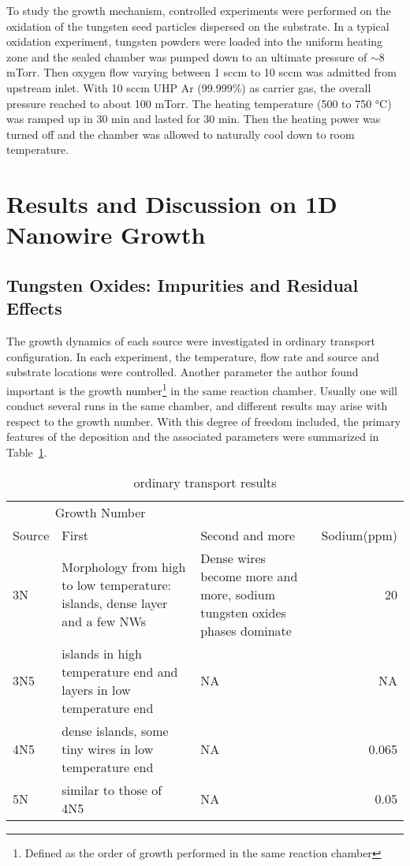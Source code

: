 To study the growth mechanism, controlled experiments were performed on the oxidation of the tungsten seed particles dispersed on the substrate. In a typical oxidation experiment, tungsten powders were loaded into the uniform heating zone and the sealed chamber was pumped down to an ultimate pressure of $\sim8$ mTorr. Then oxygen flow varying between 1 sccm to 10 sccm was admitted from upstream inlet. With 10 sccm UHP Ar (99.999\%) as carrier gas, the overall pressure reached to about 100 mTorr. The heating temperature (500 to 750 \si{\degreeCelsius}) was ramped up in 30 min and lasted for 30 min. Then the heating power was turned off and the chamber was allowed to naturally cool down to room temperature.

\section{Results and Discussion on 1D Nanowire Growth}
\subsection{Tungsten Oxides: Impurities and Residual Effects}\label{sec:nawox}

The growth dynamics of each source were investigated in ordinary transport configuration. In each experiment, the temperature, flow rate and source and substrate locations were controlled. Another parameter the author found important is the growth number\footnote{Defined as the order of growth performed in the same reaction chamber} in the same reaction chamber. Usually one will conduct several runs in the same chamber, and different results may arise with respect to the growth number. With this degree of freedom included, the primary features of the deposition and the associated parameters were summarized in Table~\ref{tab:wot}.
\begin{table}[htb]
\centering
\caption{ ordinary transport results}\label{tab:wot}
\begin{tabular}{lp{2in}p{2in}r}
\toprule
\multicolumn{2}{c}{Growth Number} \\
\cmidrule(l){2-3}
 Source   & First & Second and more & Sodium(ppm)   \\
\midrule
3N      & Morphology from high to low temperature: islands, dense layer and a few NWs & Dense wires become more and more, sodium tungsten oxides phases dominate & 20  \\
3N5     & islands in high temperature end and layers in low temperature end & NA &      NA\\
4N5     & dense islands, some tiny wires in low temperature end & NA & 0.065 \\
5N      & similar to those of 4N5  & NA & 0.05\\
\bottomrule
\end{tabular}
\end{table}

